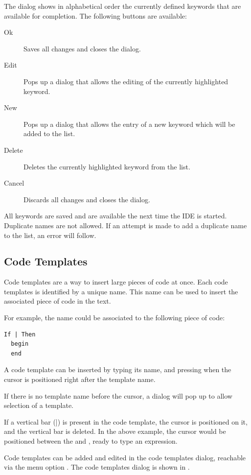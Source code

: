 
The dialog shows in alphabetical order the currently defined keywords 
that are available for completion. The following buttons are available:
\begin{description}
\item[Ok] Saves all changes and closes the dialog.
\item[Edit] Pops up a dialog that allows the editing of the currently
highlighted keyword.
\item[New] Pops up a dialog that allows the entry of a new keyword which will be
added to the list.
\item[Delete] Deletes the currently highlighted keyword from the list.
\item[Cancel] Discards all changes and closes the dialog.
\end{description}
All keywords are saved and are available the next time the IDE is started.
Duplicate names are not allowed. If an attempt is made to add a duplicate
name to the list, an error will follow.

\subsection{Code Templates}
Code templates are a way to insert large pieces of code at once. Each
code templates is identified by a unique name. This name can be used to
insert the associated piece of code in the text.

For example, the name  could be associated to the following
piece of code:
\begin{verbatim}
If | Then
  begin
  end
\end{verbatim}
A code template can be inserted by typing its name, and pressing 
when the cursor is positioned right after the template name.

If there is no template name before the cursor, a dialog will pop up to
allow selection of a template.

If a vertical bar (|) is present in the code template, the cursor is positioned
on it, and the vertical bar is deleted. In the above example, the cursor would be
positioned between the  and , ready to type an expression.

Code templates can be added and edited in the code templates dialog, reachable via
the menu option .
The code templates dialog is shown in .

